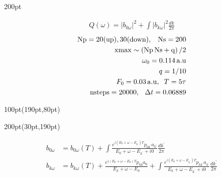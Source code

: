 \begin{frame}
\begin{textblock*}{200pt}
{\begin{minipage}{\linewidth}
{\footnotesize
\begin{align}
  Q(\omega) = \left| b_{0\omega}\right|^2
        + \int \left| b_{k\omega}\right|^2 \frac{dk}{2\pi} \nonumber
\end{align}
        \begin{align}
                \rm{Np} = 20(up),30(down),\;\;\;\rm{Ns} = 200 \nonumber\\
                \rm{xmax} \sim \left(\rm{Np\,Ns}+q\right)/2 \nonumber\\
                \omega_0 = 0.114\,{\rm a.u}\nonumber\\
                q=1/10\nonumber\\
                F_0 = 0.03\,{\rm a.u}, \;\;T=5\tau\nonumber\\
                {\rm nsteps} = 20 000,\, \;\;\Delta t=0.06889\nonumber
        \end{align}

}
\end{minipage}
}
\end{textblock*}




\begin{textblock*}{100pt}(190pt,80pt)
\end{textblock*}



\begin{textblock*}{200pt}(30pt,190pt)
\footnotesize

\begin{align}
b_{0\omega} & = b_{0\omega}(T)
 +\int\frac{e^{i(E_0+\omega-E_{k^\prime})T}p_{0k^\prime}a_{k^\prime}}
{E_0+\omega-E_{k^\prime} + i0} \frac{dk^\prime}{2\pi} \nonumber\\
b_{k\omega} & = b_{k\omega}(T)
 +\frac{e^{i(E_k+\omega-E_0)T}p_{k0}a_0}{E_k+\omega-E_0}
 +\int\frac{e^{i(E_k+\omega-E_{k^\prime})T}p_{kk^\prime}a_{k^\prime}}
{E_k+\omega-E_{k^\prime} + i0} \frac{dk^\prime}{2\pi} \nonumber
\end{align}


\end{textblock*}
\end{frame}
